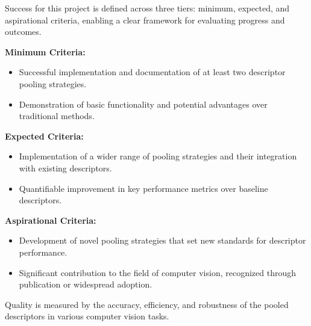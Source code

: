Success for this project is defined across three tiers: minimum, expected, and aspirational criteria, enabling a clear framework for evaluating progress and outcomes.

\textbf{Minimum Criteria:}
\begin{itemize}
    \item Successful implementation and documentation of at least two descriptor pooling strategies.
    \item Demonstration of basic functionality and potential advantages over traditional methods.
\end{itemize}

\textbf{Expected Criteria:}
\begin{itemize}
    \item Implementation of a wider range of pooling strategies and their integration with existing descriptors.
    \item Quantifiable improvement in key performance metrics over baseline descriptors.
\end{itemize}

\textbf{Aspirational Criteria:}
\begin{itemize}
    \item Development of novel pooling strategies that set new standards for descriptor performance.
    \item Significant contribution to the field of computer vision, recognized through publication or widespread adoption.
\end{itemize}

Quality is measured by the accuracy, efficiency, and robustness of the pooled descriptors in various computer vision tasks.
